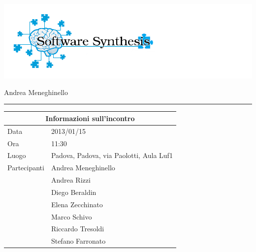\documentclass[a4paper,10pt,openright]{article}
\begin{document}
\includegraphics[width=1.5\textwidth]{logo}

\begin{center}

\begin{Large}
\hspace{1.2cm}{Verbale d'incontro 2013/01/15}
\newline
\end{Large}

\begin{small}
	Andrea Meneghinello
\end{small}

\noindent\rule{\textwidth}{0.4pt}
\newline

\begin{tabular}{ll}
\toprule
\multicolumn{2}{c}{\sffamily Informazioni sull'incontro}\\
\midrule
Data & 2013/01/15 \\
Ora & 11:30 \\
Luogo & Padova, Padova, via Paolotti, Aula Luf1 \\
Partecipanti & Andrea Meneghinello \\ & Andrea Rizzi \\& Diego Beraldin \\& Elena Zecchinato\\   & Marco Schivo \\ & Riccardo Tresoldi \\ & Stefano Farronato \\
\bottomrule
\end{tabular}

\end{center}
\end{document}
